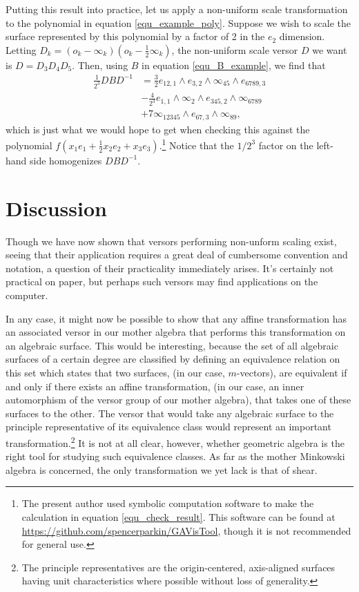 \documentclass{birkjour}
\theoremstyle{definition}
\theoremstyle{remark}
\numberwithin{equation}{section}
\newcommand{\nvai}{\infty}
\newcommand{\nvao}{o}
\begin{document}
Putting this result into practice, let us apply a non-uniform scale transformation
to the polynomial in equation \eqref{equ_example_poly}.  Suppose we wish
to scale the surface represented by this polynomial by a factor of 2 in the $e_2$ dimension.
Letting $D_k=(\nvao_k-\nvai_k)\left(\nvao_k-\frac{1}{2}\nvai_k\right)$, the non-uniform
scale versor $D$ we
want is $D=D_3D_4D_5$.  Then, using $B$ in equation \eqref{equ_B_example}, we find that
\begin{align}
\frac{1}{2^3}DBD^{-1} &= \frac{3}{2}e_{12,1}\wedge e_{3,2}\wedge \nvai_{45}\wedge e_{6789,3}\nonumber \\
 &-\frac{4}{2^3}e_{1,1}\wedge\nvai_2\wedge e_{345,2}\wedge\nvai_{6789}\nonumber \\
 &+7\nvai_{12345}\wedge e_{67,3}\wedge \nvai_{89},\label{equ_check_result}
\end{align}
which is just what we would hope to get when checking this against the
polynomial $f\left(x_1e_1+\frac{1}{2}x_2e_2+x_3e_3\right)$.\footnote{The present author
used symbolic computation software to make the calculation in equation \eqref{equ_check_result}.
This software can be found at \url{https://github.com/spencerparkin/GAVisTool}, though it
is not recommended for general use.}  Notice that the $1/2^3$ factor on the left-hand
side homogenizes $DBD^{-1}$.

\section{Discussion}

Though we have now shown that versors performing non-unform scaling
exist, seeing that their application requires a great deal of cumbersome convention and notation,
a question of their practicality immediately arises.  It's certainly not practical on paper, but
perhaps such versors may find applications on the computer.

In any case, it might now be possible to show that any affine transformation
has an associated versor in our mother algebra that performs
this transformation on an algebraic surface.  This would be interesting,
because the set of all algebraic surfaces of a certain degree are classified by defining an
equivalence relation on this set which states that two surfaces, (in our case, $m$-vectors),
are equivalent if and only if there exists an affine transformation, (in our case, an inner
automorphism of the versor group of our mother algebra), that takes one of these
surfaces to the other.  The versor that would take any algebraic surface to the
principle representative of its equivalence class would represent an important transformation.\footnote{The
principle representatives are the origin-centered, axis-aligned surfaces having unit characteristics where possible
without loss of generality.}
It is not at all clear, however,
whether geometric algebra is the right tool for studying such equivalence classes.
As far as the mother Minkowski algebra is concerned, the only transformation we yet lack
is that of shear.
\end{document}
